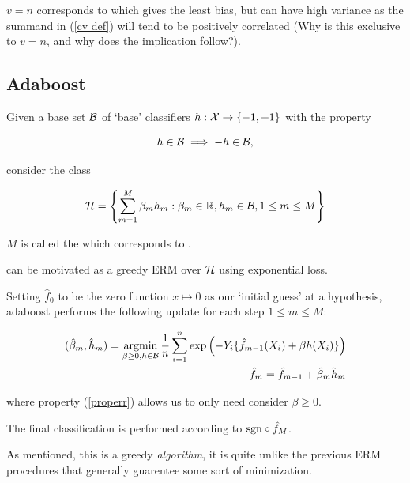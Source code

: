 \documentclass[11pt]{scrartcl}
\begin{document}
\begin{remark}
$v=n$ corresponds to  which gives the least bias, but can have high variance as the summand in (\ref{cv def}) will tend to be positively correlated (Why is this exclusive to $v=n$, and why does the implication follow?).
\end{remark}

\subsection{Adaboost}

Given a base set $\mathcal{B}$ of `base' classifiers $h : \mathcal{X} \rightarrow \{ -1, +1 \}$ with the property 

\begin{equation}
h \in \mathcal{B} \implies -h \in \mathcal{B},
\label{properr}
\end{equation}

consider the class

\begin{equation}
    \mathcal{H} = \left\{ \sum_{m=1}^M \beta_m h_m : \beta_m \in \mathbb R, h_m \in \mathcal{B}, 1 \le m \le M  \right\}
\end{equation}

$M$ is called the  which corresponds to .

 can be
motivated as a greedy ERM over $\mathcal{H}$ using exponential loss.

Setting $\hat{f}_0$ to be the zero function $x \mapsto 0$ as our `initial guess' at a hypothesis, adaboost performs the following update for each step $1 \le m \le M$:

\begin{align}
    (\hat{\beta}_m, \hat{h}_m) = \operatorname*{arg min}_{\beta \ge 0 , h \in \mathcal{B}} \frac1n \sum_{i=1}^n \text{exp} \left(  -Y_i \{ \hat{f}_{m-1} (X_i) + \beta h(X_i) \}  \right) \\
    \hat{f}_m = \hat{f}_{m-1} + \hat{\beta}_m \hat{h}_m
\label{adaboost update}
\end{align}

where property (\ref{properr}) allows us to only need consider $\beta \ge 0$.

The final classification is performed according to $\text{sgn} \circ \hat{f}_M$.

\begin{remark}
As mentioned, this is a greedy \textit{algorithm}, it is quite unlike the previous ERM procedures that generally guarentee some sort of minimization.
\end{remark}
\end{document}
